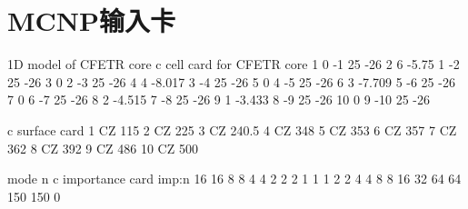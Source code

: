 \chapter{MCNP输入卡}

\begin{python}
1D model of CFETR core                                                          
c cell card for CFETR core                                                     
1 0 -1 25 -26
2 6 -5.75 1 -2 25 -26
3 0 2 -3 25 -26
4 4 -8.017 3 -4 25 -26
5 0 4 -5 25 -26
6 3 -7.709 5 -6 25 -26
7 0 6 -7 25 -26
8 2 -4.515 7 -8 25 -26
9 1 -3.433 8 -9 25 -26
10 0 9 -10 25 -26                    

c surface card
1 CZ 115
2 CZ 225
3 CZ 240.5
4 CZ 348                                            
5 CZ 353
6 CZ 357
7 CZ 362
8 CZ 392
9 CZ 486
10 CZ 500                                                                    

mode n
c importance card
imp:n 16 16 8 8 4 4 2 2 2 1 1 1 2 2 4 4 8 8 16 32 64 64 150 150 0
\end{python}
